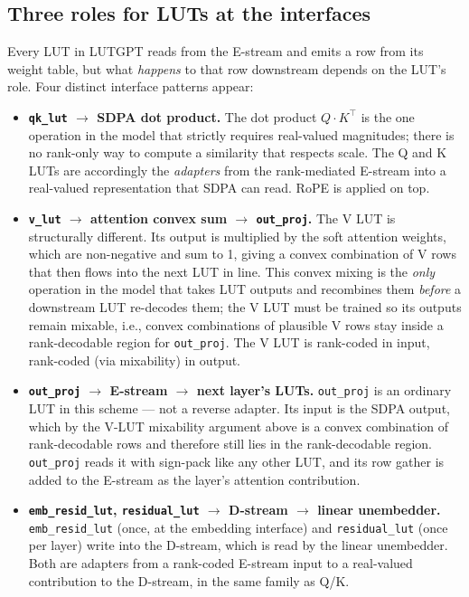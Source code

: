 \documentclass[11pt]{article}
\begin{document}
\subsection{Three roles for LUTs at the interfaces}

Every LUT in LUTGPT reads from the E-stream and emits a row from its weight table, but what \emph{happens} to that row downstream depends on the LUT's role. Four distinct interface patterns appear:

\begin{itemize}[leftmargin=*,topsep=2pt,itemsep=1pt]
\item \textbf{\texttt{qk\_lut} $\to$ SDPA dot product.} The dot product $Q \cdot K^\top$ is the one operation in the model that strictly requires real-valued magnitudes; there is no rank-only way to compute a similarity that respects scale. The Q and K LUTs are accordingly the \emph{adapters} from the rank-mediated E-stream into a real-valued representation that SDPA can read. RoPE is applied on top.

\item \textbf{\texttt{v\_lut} $\to$ attention convex sum $\to$ \texttt{out\_proj}.} The V LUT is structurally different. Its output is multiplied by the soft attention weights, which are non-negative and sum to 1, giving a convex combination of V rows that then flows into the next LUT in line. This convex mixing is the \emph{only} operation in the model that takes LUT outputs and recombines them \emph{before} a downstream LUT re-decodes them; the V LUT must be trained so its outputs remain mixable, i.e., convex combinations of plausible V rows stay inside a rank-decodable region for \texttt{out\_proj}. The V LUT is rank-coded in input, rank-coded (via mixability) in output.

\item \textbf{\texttt{out\_proj} $\to$ E-stream $\to$ next layer's LUTs.} \texttt{out\_proj} is an ordinary LUT in this scheme --- not a reverse adapter. Its input is the SDPA output, which by the V-LUT mixability argument above is a convex combination of rank-decodable rows and therefore still lies in the rank-decodable region. \texttt{out\_proj} reads it with sign-pack like any other LUT, and its row gather is added to the E-stream as the layer's attention contribution.

\item \textbf{\texttt{emb\_resid\_lut}, \texttt{residual\_lut} $\to$ D-stream $\to$ linear unembedder.} \texttt{emb\_resid\_lut} (once, at the embedding interface) and \texttt{residual\_lut} (once per layer) write into the D-stream, which is read by the linear unembedder. Both are adapters from a rank-coded E-stream input to a real-valued contribution to the D-stream, in the same family as Q/K.
\end{itemize}
\end{document}

